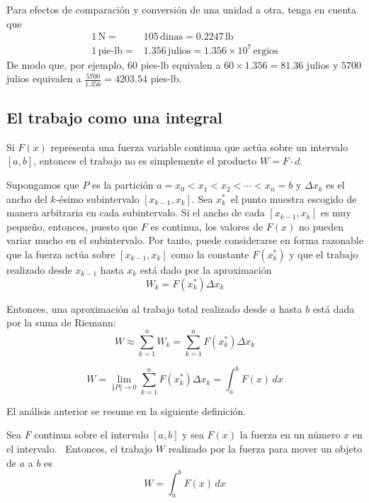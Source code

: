 Para efectos de comparación y conversión de una unidad a otra, tenga en cuenta que
\begin{align*}
  1\,\text{N}=& 105\, \text{dinas}=0.2247\, \text{lb} \\
  1\,\text{pie-lb} =& 1.356\, \text{julios} =1.356\times 10^{7}\, \text{ergios}
\end{align*}
De modo que, por ejemplo, $60$ pies-lb equivalen a $60\times 1.356=81.36$ julios y $5700$ julios equivalen a $\frac{5700}{1.356}=4203.54$ pies-lb.

\subsection{El trabajo como una integral}

Si $F(x)$ representa una fuerza
variable continua que actúa sobre un intervalo $[a,b]$, entonces el
trabajo no es simplemente el producto $W=F\cdot d$.

Supongamos que $P$ es la partición $a=x_{0}<x_{1}<x_{2}<\cdots <x_{n}=b$ y $%
\Delta x_{k}$ es el ancho del $k$-ésimo subintervalo $[x_{k-1},x_{k}]$. Sea $x_{k}^{\ast }$\ el punto muestra escogido de manera
arbitraria en cada subintervalo. Si el ancho de cada $[x_{k-1},x_{k}]$ es
muy pequeño, entonces, puesto que $F$ es continua, los valores
de $F(x)$ no pueden variar mucho en el subintervalo. Por tanto, puede considerarse en forma razonable que la fuerza actúa sobre $[x_{k-1},x_{k}]$ como la constante $F\left( x_{k}^{\ast }\right) $ y
que el trabajo realizado desde $x_{k-1}$ hasta $x_{k}$ está dado por la
aproximación
\[
  W_{k}=F\left( x_{k}^{\ast }\right) \Delta x_{k}
\]

Entonces, una aproximación al trabajo total realizado desde $a$ hasta $b$
está dada por la suma de Riemann:
\[
  W\approx \sum_{k=1}^{n}W_{k}=\sum_{k=1}^{n}F\left( x_{k}^{\ast }\right)
  \Delta x_{k}
\]

\[
  W=\lim_{\left\Vert P\right\Vert \rightarrow 0}\sum_{k=1}^{n}F\left(
  x_{k}^{\ast }\right) \Delta x_{k}=\int_{a}^{b}F\left( x\right)\,dx
\]

El análisis anterior se resume en la siguiente definición.

\begin{defi}
  Sea $F$ continua sobre el intervalo $[a,b]$ y sea $F(x)$ la fuerza en un número $x$ en el intervalo. \ Entonces, el trabajo $W$ realizado por la fuerza para mover un objeto de $a$ a $b$ es
  \begin{equation}\label{trabajo}
    W=\int_{a}^{b}F\left( x\right)\,dx
  \end{equation}
\end{defi}

